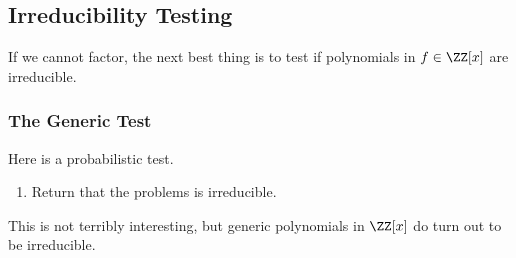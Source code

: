 \documentclass[../notes.tex]{subfiles}
\begin{document}
\subsection{Irreducibility Testing}
If we cannot factor, the next best thing is to test if polynomials in $f\in \ZZ[x]$ are irreducible.

\subsubsection{The Generic Test}
Here is a probabilistic test.
\begin{enumerate}
	\item Return that the problems is irreducible.
\end{enumerate}
This is not terribly interesting, but generic polynomials in $\ZZ[x]$ do turn out to be irreducible.
\end{document}
